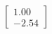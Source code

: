 \documentclass[preview]{standalone}
\begin{document}
\begin{align*}
\begin{bmatrix} 1.00 \\ -2.54 \end{bmatrix}
\end{align*}
\end{document}
